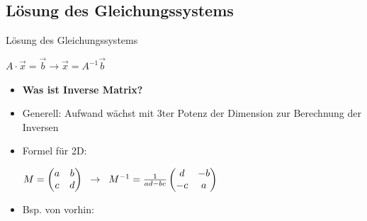 \documentclass[10pt,aspectratio=169]{beamer}
\begin{document}
  \subsection{Lösung des Gleichungssystems}
  \begin{frame}{Lösung des Gleichungssystems}
    \begin{center}
      $A \cdot \vec{x} = \vec{b} \rightarrow \vec{x} = A^{-1}\vec{b}$
    \end{center}
    \begin{itemize}
      \item \textbf{Was ist Inverse Matrix?}
      \item Generell: Aufwand wächst mit 3ter Potenz der Dimension zur Berechnung der Inversen
      \item Formel für 2D:\\
      \begin{center}
        $M= \begin{pmatrix}
          a & b\\
          c & d\\
        \end{pmatrix}\hspace{0.2cm} \rightarrow \hspace{0.2cm}
        M^{-1} = \frac{1}{ad - bc}
        \begin{pmatrix}
          d & -b\\
          -c & a
        \end{pmatrix}$
      \end{center}
      \item Bsp. von vorhin:
      

\end{itemize}
\end{frame}
\end{document}
